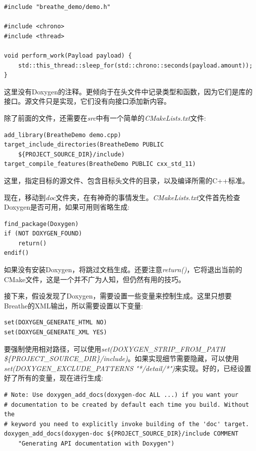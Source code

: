 \begin{lstlisting}[style=styleCXX]
#include "breathe_demo/demo.h"

#include <chrono>
#include <thread>

void perform_work(Payload payload) {
	std::this_thread::sleep_for(std::chrono::seconds(payload.amount));
}	
\end{lstlisting}

这里没有Doxygen的注释。更倾向于在头文件中记录类型和函数，因为它们是库的接口。源文件只是实现，它们没有向接口添加新内容。

除了前面的文件，还需要在\textit{src}中有一个简单的\textit{CMakeLists.txt}文件:

\begin{lstlisting}[style=styleCMake]
add_library(BreatheDemo demo.cpp)
target_include_directories(BreatheDemo PUBLIC
	${PROJECT_SOURCE_DIR}/include)
target_compile_features(BreatheDemo PUBLIC cxx_std_11)
\end{lstlisting}

这里，指定目标的源文件、包含目标头文件的目录，以及编译所需的C++标准。

现在，移动到\textit{doc}文件夹，在有神奇的事情发生。\textit{CMakeLists.txt}文件首先检查Doxygen是否可用，如果可用则省略生成:

\begin{lstlisting}[style=styleCMake]
find_package(Doxygen)
if (NOT DOXYGEN_FOUND)
	return()
endif()
\end{lstlisting}

如果没有安装Doxygen，将跳过文档生成。还要注意\textit{return()}，它将退出当前的CMake文件，这是一个并不广为人知，但仍然有用的技巧。

接下来，假设发现了Doxygen，需要设置一些变量来控制生成。这里只想要Breathe的XML输出，所以需要设置以下变量:

\begin{lstlisting}[style=styleCMake]
set(DOXYGEN_GENERATE_HTML NO)
set(DOXYGEN_GENERATE_XML YES)
\end{lstlisting}

要强制使用相对路径，可以使用\textit{set(DOXYGEN\_STRIP\_FROM\_PATH \$\{PROJECT\_SOURCE\_DIR\}/include)}。如果实现细节需要隐藏，可以使用\textit{set(DOXYGEN\_EXCLUDE\_PATTERNS "*/detail/*")}来实现。好的，已经设置好了所有的变量，现在进行生成:

\begin{lstlisting}[style=styleCMake]
# Note: Use doxygen_add_docs(doxygen-doc ALL ...) if you want your
# documentation to be created by default each time you build. Without the 
# keyword you need to explicitly invoke building of the 'doc' target.
doxygen_add_docs(doxygen-doc ${PROJECT_SOURCE_DIR}/include COMMENT
	"Generating API documentation with Doxygen")
\end{lstlisting}

